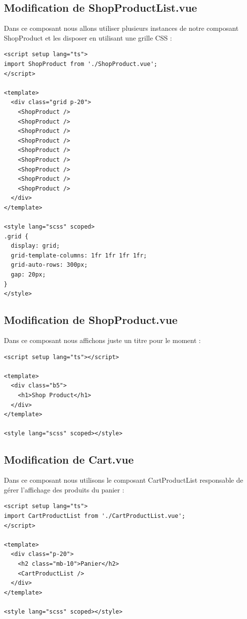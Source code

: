 \subsection{Modification de ShopProductList.vue}
Dans ce composant nous allons utiliser plusieurs instances de notre composant ShopProduct et les disposer en utilisant une grille CSS :
\begin{verbatim}
<script setup lang="ts">
import ShopProduct from './ShopProduct.vue';
</script>

<template>
  <div class="grid p-20">
    <ShopProduct />
    <ShopProduct />
    <ShopProduct />
    <ShopProduct />
    <ShopProduct />
    <ShopProduct />
    <ShopProduct />
    <ShopProduct />
    <ShopProduct />
  </div>
</template>

<style lang="scss" scoped>
.grid {
  display: grid;
  grid-template-columns: 1fr 1fr 1fr 1fr;
  grid-auto-rows: 300px;
  gap: 20px;
}
</style>
\end{verbatim}

\subsection{Modification de ShopProduct.vue}
Dans ce composant nous affichons juste un titre pour le moment :
\begin{verbatim}
<script setup lang="ts"></script>

<template>
  <div class="b5">
    <h1>Shop Product</h1>
  </div>
</template>

<style lang="scss" scoped></style>
\end{verbatim}

\subsection{Modification de Cart.vue}
Dans ce composant nous utilisons le composant CartProductList responsable de gérer l'affichage des produits du panier :
\begin{verbatim}
<script setup lang="ts">
import CartProductList from './CartProductList.vue';
</script>

<template>
  <div class="p-20">
    <h2 class="mb-10">Panier</h2>
    <CartProductList />
  </div>
</template>

<style lang="scss" scoped></style>
\end{verbatim}

